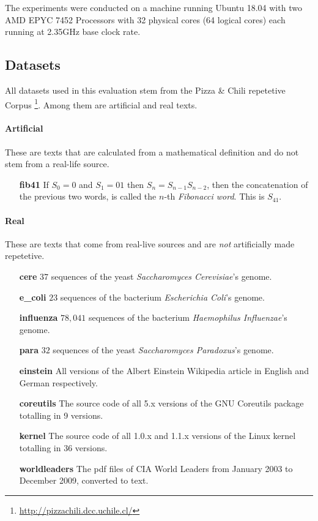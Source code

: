 \documentclass{scrartcl}
\begin{document}
The experiments were conducted on a machine running Ubuntu 18.04 with two AMD EPYC 7452 Processors with 32 physical cores (64 logical cores) each running at 2.35GHz base clock rate.

\subsection{Datasets}

All datasets used in this evaluation stem from the Pizza \& Chili repetetive Corpus \footnote{\url{http://pizzachili.dcc.uchile.cl/}}.
Among them are  artificial and real texts.

\paragraph{Artificial}

These are texts that are calculated from a mathematical definition and do not stem from a real-life source.

\begin{itemize}[leftmargin=2cm]
	\item[\textbf{fib41}] If $S_0 = 0$ and $S_1 = 01$ then $S_n = S_{n-1}S_{n-2}$,
		then the concatenation of the previous two words, is called the $n$-th \emph{Fibonacci word}. \cite{barabash_periodic_2016}
		This is $S_{41}$.
\end{itemize}

\paragraph{Real}

These are texts that come from real-live sources and are \emph{not} artificially made repetetive.

\begin{itemize}[leftmargin=2cm]
	\item[\textbf{cere}] $37$ sequences of the yeast \emph{Saccharomyces Cerevisiae}'s genome.
	\item[\textbf{e\_coli}] $23$ sequences of the bacterium \emph{Escherichia Coli}'s genome.
	\item[\textbf{influenza}] $78,041$ sequences of the bacterium \emph{Haemophilus Influenzae}'s genome.
	\item[\textbf{para}] $32$ sequences of the yeast \emph{Saccharomyces Paradoxus}'s genome.
	\item[\textbf{einstein}] All versions of the Albert Einstein Wikipedia article in English and German respectively.
	\item[\textbf{coreutils}] The source code of all 5.x versions of the GNU Coreutils package totalling in 9 versions.
	\item[\textbf{kernel}] The source code of all 1.0.x and 1.1.x versions of the Linux kernel totalling in 36 versions.
	\item[\textbf{worldleaders}] The pdf files of CIA World Leaders from January 2003 to December 2009, converted to text.
\end{itemize}
\end{document}
